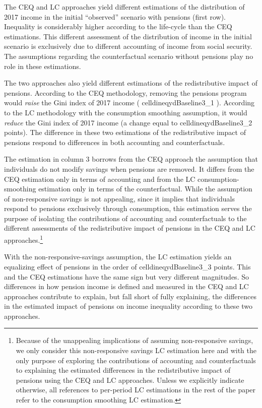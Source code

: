 \documentclass{article}
\newcommand{\celldineqydBaseline}[2]{%
  \csname celldineqydBaseline#1_#2\endcsname
}
\begin{document}
The CEQ and LC approaches yield different estimations of the distribution of 2017 income in the initial ``observed'' scenario with pensions (first row). Inequality is considerably higher according to the life-cycle than the CEQ estimations.  This different assessment of the distribution of income in the initial scenario is exclusively due to different accounting of income from social security. The assumptions regarding the counterfactual scenario without pensions play no role in these estimations.   

The two approaches also yield different estimations of the redistributive impact of pensions. According to the CEQ methodology, removing the pensions program would \textit{raise} the Gini index of 2017 income ( \celldineqydBaseline{3}{1}). According to the LC methodology with the consumption smoothing assumption, it would \textit{reduce} the Gini index of 2017 income (a change equal to  \celldineqydBaseline{3}{2} points).  The difference in these two estimations of the redistributive impact of pensions respond to differences in both accounting and counterfactuals. 

The estimation in column 3 borrows from the CEQ approach the assumption that individuals do not modify savings when pensions are removed. It differs from the CEQ estimation only in terms of accounting and from the LC consumption-smoothing estimation only in terms of the counterfactual. While the assumption of non-responsive savings is not appealing, since it implies that individuals respond to pensions exclusively through consumption, this estimation  serves the purpose of  isolating the contributions of accounting and counterfactuals to the different assessments of the redistributive impact of pensions in the CEQ and LC approaches.\footnote{Because of the unappealing implications of assuming non-responsive savings, we only consider this non-responsive savings LC estimation here and with the only purpose of exploring the contributions of accounting and counterfactuals to explaining the estimated differences in the redistributive impact of pensions using the CEQ and LC approaches. Unless we explicitly indicate otherwise, all references to per-period LC estimations in the rest of the paper refer to the consumption smoothing LC estimation.}  

With the non-responsive-savings assumption, the LC estimation yields an equalizing effect of pensions  in the order of \celldineqydBaseline{3}{3} points. This  and the CEQ  estimations have the same sign but very different magnitudes. So differences in how pension income is defined and measured in the CEQ and LC approaches contribute to explain, but fall short of fully explaining, the differences in the estimated impact of pensions on income inequality according to these two approaches. 
\end{document}
